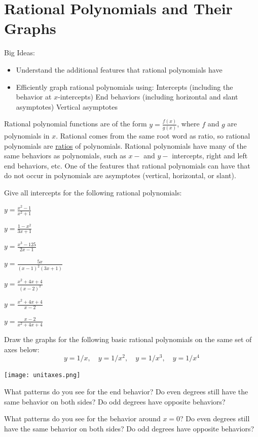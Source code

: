 \section{Rational Polynomials and Their Graphs}
Big Ideas:
\begin{itemize}
\item Understand the additional features that rational polynomials have
\item Efficiently graph rational polynomials using:
\subitem Intercepts (including the behavior at $x$-intercepts)
\subitem End behaviors (including horizontal and slant asymptotes)
\subitem Vertical asymptotes
\end{itemize}
\begin{info} Rational polynomial functions are of the form $y =\frac{f(x)}{g(x)}$, where $f$ and $g$ are polynomials in $x$. Rational comes from the same root word as ratio, so rational polynomials are \underline{ratios} of polynomials. Rational polynomials have many of the same behaviors as polynomials, such as $x-$ and $y-$ intercepts, right and left end behaviors, etc. One of the features that rational polynomials can have that do not occur in polynomials are asymptotes (vertical, horizontal, or slant).\end{info}
\bq Give all intercepts for the following rational polynomials:
\be
\item $y=\frac{x^2-1}{x^2+1}$
\item $y=\frac{1-x^2}{3x+1}$
\item $y=\frac{x^3-125}{2x-1}$
\item $y=\frac{5x}{(x-1)^2(3x+1)}$
\item $y=\frac{x^2+4x+4}{(x-2)^2}$
\item $y=\frac{x^2+4x+4}{x-2}$
\item $y=\frac{x-2}{x^2+4x+4}$
\ee
\eq

\bq Draw the graphs for the following basic rational polynomials on the same set of axes below:
$$ y=1/x,\quad y=1/x^2, \quad y=1/x^3, \quad y=1/x^4$$

\begin{center} \texttt{[image: unitaxes.png]} \end{center}

\be
\item What patterns do you see for the end behavior? Do even degrees still have the same behavior on both sides? Do odd degrees have opposite behaviors?
\item What patterns do you see for the behavior around $x=0$? Do even degrees still have the same behavior on both sides? Do odd degrees have opposite behaviors?
\ee
\eq

